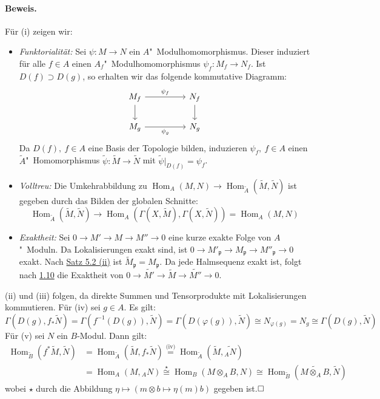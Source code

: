 \documentclass[11pt,b5paper,openany]{memoir}
\def \qed {$\hfill\square$}
\begin{document}
\paragraph{Beweis.} Für (i) zeigen wir: \begin{itemize}
\item \textit{Funktorialität:} Sei $\psi:M\to N$ ein $A$"~Modulhomomorphismus. Dieser induziert für alle $f\in A$ einen $A_f$"~Modulhomomorphismus $\psi_f:M_f\to N_f$. Ist $D(f)\supset D(g)$, so erhalten wir das folgende kommutative Diagramm:
\[\begin{tikzcd}
M_f\ar[rr, "\psi_f"]\ar[d] && N_f\ar[d]\\
M_g\ar[rr, "\psi_g"'] && N_g
\end{tikzcd} \]
Da $D(f),\ f\in A$ eine Basis der Topologie bilden, induzieren $\psi_f,\ f\in A$ einen $\widetilde{A}$"~Homomorphismus $\widetilde{\psi}:\widetilde{M}\to\widetilde{N}$ mit $\widetilde{\psi}|_{D(f)}=\psi_f$.
\item \textit{Volltreu:} Die Umkehrabbildung zu $\operatorname{Hom}_A(M,N)\to\operatorname{Hom}_{\widetilde{A}}(\widetilde{M},\widetilde{N})$ ist gegeben durch das Bilden der globalen Schnitte: 
\[\operatorname{Hom}_{\widetilde{A}}(\widetilde{M},\widetilde{N})\to\operatorname{Hom}_A(\Gamma(X,\widetilde{M}),\Gamma(X,\widetilde{N}))=\operatorname{Hom}_A(M,N)\]
\item \textit{Exaktheit:} Sei $0\to M'\to M\to M''\to 0$ eine kurze exakte Folge von $A$"~Moduln. Da Lokalisierungen exakt sind, ist $0\to M'_\mathfrak{p}\to M_\mathfrak{p}\to M''_\mathfrak{p}\to 0$ exakt. Nach \hyperref[5.2]{Satz 5.2 (ii)} ist $\widetilde{M}_\mathfrak{p}=M_\mathfrak{p}$. Da jede Halmsequenz exakt ist, folgt nach \hyperref[1.10]{1.10} die Exaktheit von $0\to\widetilde{M'}\to\widetilde{M}\to\widetilde{M''}\to 0$.
\end{itemize}
(ii) und (iii) folgen, da direkte Summen und Tensorprodukte mit Lokalisierungen kommutieren. Für (iv) sei $g\in A$. Es gilt:
\[\Gamma(D(g),f_\ast\widetilde{N}) = \Gamma(f^{-1}(D(g)),\widetilde{N}) = \Gamma(D(\varphi(g)),\widetilde{N}) \cong N_{\varphi(g)} = N_g\cong \Gamma(D(g),\widetilde{N})\]
Für (v) sei $N$ ein $B$-Modul. Dann gilt:
\begin{align*}
\operatorname{Hom}_{\widetilde{B}}(f^\ast\widetilde{M},\widetilde{N})&=\operatorname{Hom}_{\widetilde{A}}(\widetilde{M},f_\ast \widetilde{N}) \stackrel{\text{(iv)}}{=}\operatorname{Hom}_{\widetilde{A}}(\widetilde{M}, \widetilde{_AN})\\
&= \operatorname{Hom}_A(M, {_AN}) \stackrel{\star}{\cong}\operatorname{Hom}_B(M\otimes_A B,N)\cong\operatorname{Hom}_{\widetilde{B}}(\widetilde{M\otimes_A B},\widetilde{N})
\end{align*}
wobei $\star$ durch die Abbildung $\eta\mapsto (m\otimes b\mapsto \eta(m)b)$ gegeben ist.\qed
\end{document}
